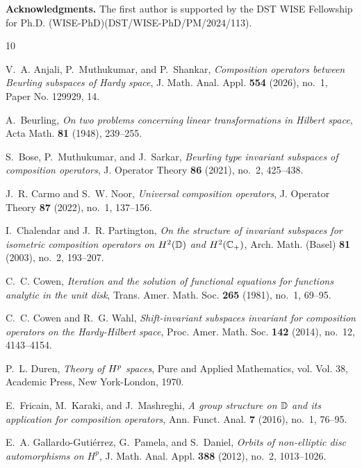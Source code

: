 \documentclass[12pt, reqno]{amsart}
\theoremstyle{definition}
\numberwithin{equation}{section}
\begin{document}
{\bf Acknowledgments.} The first author is supported by the DST WISE Fellowship for Ph.D. (WISE-PhD)(DST/WISE-PhD/PM/2024/113).
 \nocite{*} 

% 
\begin{thebibliography}{10}
	
	V.~A. Anjali, P.~Muthukumar, and P.~Shankar, \emph{Composition operators
		between {B}eurling subspaces of {H}ardy space}, J. Math. Anal. Appl.
	\textbf{554} (2026), no.~1, Paper No. 129929, 14. 
	
	A.~Beurling, \emph{On two problems concerning linear transformations in
		{H}ilbert space}, Acta Math. \textbf{81} (1948), 239--255. 
	
	S.~Bose, P.~Muthukumar, and J.~Sarkar, \emph{Beurling type invariant subspaces
		of composition operators}, J. Operator Theory \textbf{86} (2021), no.~2,
	425--438. 
	
	J.~R. Carmo and S.~W. Noor, \emph{Universal composition operators}, J. Operator
	Theory \textbf{87} (2022), no.~1, 137--156. 
	
	I.~Chalendar and J.~R. Partington, \emph{On the structure of invariant
		subspaces for isometric composition operators on {$H^2(\Bbb D)$} and
		{$H^2(\Bbb C_+)$}}, Arch. Math. (Basel) \textbf{81} (2003), no.~2, 193--207.
	
	C.~C. Cowen, \emph{Iteration and the solution of functional equations for
		functions analytic in the unit disk}, Trans. Amer. Math. Soc. \textbf{265}
	(1981), no.~1, 69--95. 
	
	C.~C. Cowen and R.~G. Wahl, \emph{Shift-invariant subspaces invariant for
		composition operators on the {H}ardy-{H}ilbert space}, Proc. Amer. Math. Soc.
	\textbf{142} (2014), no.~12, 4143--4154. 
	
	P.~L. Duren, \emph{Theory of {$H\sp{p}$} spaces}, Pure and Applied Mathematics,
	vol. Vol. 38, Academic Press, New York-London, 1970. 
	
	E.~Fricain, M.~Karaki, and J.~Mashreghi, \emph{A group structure on {$\Bbb{D}$}
		and its application for composition operators}, Ann. Funct. Anal. \textbf{7}
	(2016), no.~1, 76--95. 
	
	E.~A. Gallardo-Guti\'{e}rrez, G.~Pamela, and S.~Daniel, \emph{Orbits of
		non-elliptic disc automorphisms on {$H^p$}}, J. Math. Anal. Appl.
	\textbf{388} (2012), no.~2, 1013--1026. 
	

\end{thebibliography}
\end{document}
